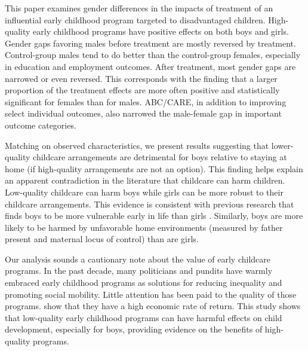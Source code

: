 This paper examines gender differences in the impacts of treatment of an influential early childhood program targeted to disadvantaged children. High-quality early childhood programs have positive effects on both boys and girls. Gender gaps favoring males before treatment are mostly reversed by treatment. Control-group males tend to do better than the control-group females, especially in education and employment outcomes. After treatment, most gender gaps are narrowed or even reversed. This corresponds with the finding that a larger proportion of the treatment effects are more often positive and statistically significant for females than for males. ABC/CARE, in addition to improving select individual outcomes, also narrowed the male-female gap in important outcome categories.

Matching on observed characteristics, we present results suggesting that lower-quality childcare arrangements are detrimental for boys relative to staying at home (if high-quality arrangements are not an option). This finding helps explain an apparent contradiction in the literature \citep{Baker_Gruber_etal_2008_JPE,Baker_Gruber_Milligan_2015_Noncog_Defects,Kottelenberg_Lehrer_2014_Gender-Effects} that childcare can harm children. Low-quality childcare can harm boys while girls can be more robust to their childcare arrangements. This evidence is consistent with previous research that finds boys to be more vulnerable early in life than girls \citep{Golding_Fitzgerald_2017_IMHJ}. Similarly, boys are more likely to be harmed by unfavorable home environments (measured by father present and maternal locus of control) than are girls.

Our analysis sounds a cautionary note about the value of early childcare programs. In the past decade, many politicians and pundits have warmly embraced early childhood programs as solutions for reducing inequality and promoting social mobility. Little attention has been paid to the quality of those programs. \cite{Garcia_Heckman_Leaf_etal_2017_Comp_CBA_Unpublished} show that they have a high economic rate of return. This study shows that low-quality early childhood programs can have harmful effects on child development, especially for boys, providing evidence on the benefits of high-quality programs.

